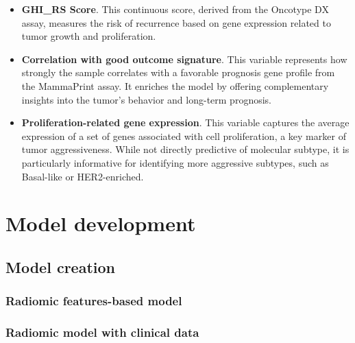 \documentclass[conference]{IEEEtran}
\begin{document}
\begin{itemize}
    \item \textbf{GHI\_RS Score}. This continuous score, derived from the Oncotype DX assay, measures the risk of recurrence based on gene expression related to tumor growth and proliferation.
    \item \textbf{Correlation with good outcome signature}. This variable represents how strongly the sample correlates with a favorable prognosis gene profile from the MammaPrint assay. It enriches the model by offering complementary insights into the tumor's behavior and long-term prognosis.
    \item \textbf{Proliferation-related gene expression}. This variable captures the average expression of a set of genes associated with cell proliferation, a key marker of tumor aggressiveness. While not directly predictive of molecular subtype, it is particularly informative for identifying more aggressive subtypes, such as Basal-like or HER2-enriched.
\end{itemize}


\section{Model development}

\subsection{Model creation}


\subsubsection{Radiomic features-based model}

\subsubsection{Radiomic model with clinical data}
\end{document}
